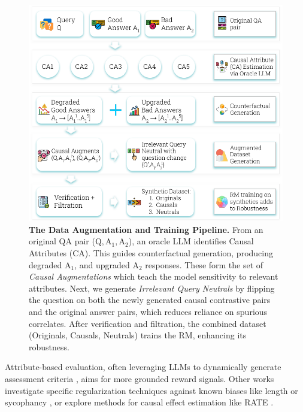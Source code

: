 \begin{figure}
    \vspace{-0.1in}
    \centering
    \includegraphics[width=\linewidth]{images/Page1Illustration.pdf}
    \caption{\textbf{The \carma{} Data Augmentation and Training Pipeline.}
From an original QA pair ($\mathrm{Q}, \mathrm{A}_1, \mathrm{A}_2$), an oracle LLM identifies Causal Attributes (CA). This guides counterfactual generation, producing degraded $\mathrm{A}_1$,  
and upgraded $\mathrm{A}_2$ responses.
These form the set of \textit{Causal Augmentations} which teach the model sensitivity to relevant attributes.
Next, we generate \textit{Irrelevant Query Neutrals} by flipping the question on both the newly generated causal contrastive pairs and the original answer pairs, which reduces reliance on spurious correlates.
After verification and filtration, the combined dataset (Originals, Causals, Neutrals) trains the RM, enhancing its robustness.\vspace{-0.5in}}
    \label{fig:enter-label}

\end{figure}
Attribute-based evaluation, often leveraging LLMs to dynamically generate assessment criteria \citep{gupta2025carmodynamiccriteriageneration}, aims for more grounded reward signals. Other works investigate specific regularization techniques against known biases like length or sycophancy \citep{wang2025beyond}, or explore methods for causal effect estimation like RATE \citep{reber2024rate}.




